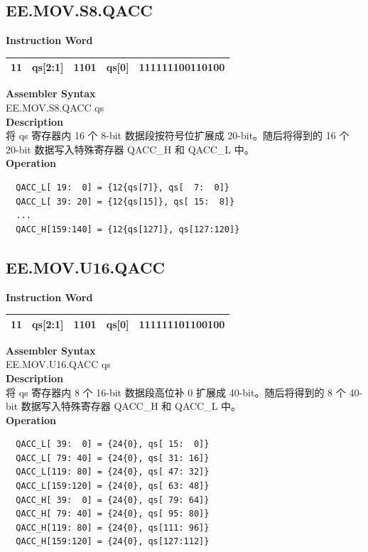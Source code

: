 \clearpage
\subsection{EE.MOV.S8.QACC}\label{instruction:EEMOVS8QACC}
\setlength\tabcolsep{6pt}
\textbf{Instruction Word} \\
\begin{tabular}{|c|c|c|c|c|}
	\hline
	11 & qs[2:1] & 1101 & qs[0] & 111111100110100 \\
	\hline
\end{tabular}

\textbf{Assembler Syntax} \\
EE.MOV.S8.QACC qs \\
\textbf{Description} \\
将 qs 寄存器内 16 个 8-bit 数据段按符号位扩展成 20-bit。随后将得到的 16 个 20-bit 数据写入特殊寄存器 QACC\_H 和 QACC\_L 中。\\
\textbf{Operation}
\begin{lstlisting}
  QACC_L[ 19:  0] = {12{qs[7]}, qs[  7:  0]}
  QACC_L[ 39: 20] = {12{qs[15]}, qs[ 15:  8]}
  ...
  QACC_H[159:140] = {12{qs[127]}, qs[127:120]}
\end{lstlisting}

\clearpage
\subsection{EE.MOV.U16.QACC}\label{instruction:EEMOVU16QACC}
\setlength\tabcolsep{6pt}
\textbf{Instruction Word} \\
\begin{tabular}{|c|c|c|c|c|}
	\hline
	11 & qs[2:1] & 1101 & qs[0] & 111111101100100 \\
	\hline
\end{tabular}

\textbf{Assembler Syntax} \\
EE.MOV.U16.QACC qs \\
\textbf{Description} \\
将 qs 寄存器内 8 个 16-bit 数据段高位补 0 扩展成 40-bit。随后将得到的 8 个 40-bit 数据写入特殊寄存器 QACC\_H 和 QACC\_L 中。\\
\textbf{Operation}
\begin{lstlisting}
  QACC_L[ 39:  0] = {24{0}, qs[ 15:  0]}
  QACC_L[ 79: 40] = {24{0}, qs[ 31: 16]}
  QACC_L[119: 80] = {24{0}, qs[ 47: 32]}
  QACC_L[159:120] = {24{0}, qs[ 63: 48]}
  QACC_H[ 39:  0] = {24{0}, qs[ 79: 64]}
  QACC_H[ 79: 40] = {24{0}, qs[ 95: 80]}
  QACC_H[119: 80] = {24{0}, qs[111: 96]}
  QACC_H[159:120] = {24{0}, qs[127:112]}
\end{lstlisting}

